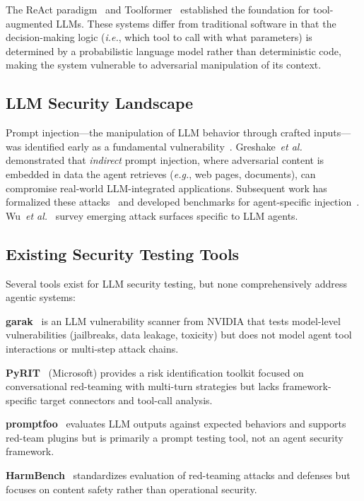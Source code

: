 \documentclass[letterpaper,twocolumn,10pt]{article}
\newcommand{\ie}{\textit{i.e.}}
\newcommand{\eg}{\textit{e.g.}}
\newcommand{\etal}{\textit{et al.}}
\begin{document}
The ReAct paradigm~\citep{yao2023react} and Toolformer~\citep{schick2023toolformer} established the foundation for tool-augmented LLMs.
These systems differ from traditional software in that the decision-making logic (\ie, which tool to call with what parameters) is determined by a probabilistic language model rather than deterministic code, making the system vulnerable to adversarial manipulation of its context.

\subsection{LLM Security Landscape}

Prompt injection---the manipulation of LLM behavior through crafted inputs---was identified early as a fundamental vulnerability~\citep{perez2022ignore}.
Greshake~\etal~\citep{greshake2023not} demonstrated that \textit{indirect} prompt injection, where adversarial content is embedded in data the agent retrieves (\eg, web pages, documents), can compromise real-world LLM-integrated applications.
Subsequent work has formalized these attacks~\citep{liu2024formalizing} and developed benchmarks for agent-specific injection~\citep{zhan2024injecagent, yi2023benchmarking, debenedetti2024agentdojo}.
Wu~\etal~\citep{wu2024new} survey emerging attack surfaces specific to LLM agents.

\subsection{Existing Security Testing Tools}

Several tools exist for LLM security testing, but none comprehensively address agentic systems:

\textbf{garak}~\citep{garak2024} is an LLM vulnerability scanner from NVIDIA that tests model-level vulnerabilities (jailbreaks, data leakage, toxicity) but does not model agent tool interactions or multi-step attack chains.

\textbf{PyRIT}~\citep{pyrit2024} (Microsoft) provides a risk identification toolkit focused on conversational red-teaming with multi-turn strategies but lacks framework-specific target connectors and tool-call analysis.

\textbf{promptfoo}~\citep{promptfoo2024} evaluates LLM outputs against expected behaviors and supports red-team plugins but is primarily a prompt testing tool, not an agent security framework.

\textbf{HarmBench}~\citep{mazeika2024harmbench} standardizes evaluation of red-teaming attacks and defenses but focuses on content safety rather than operational security.
\end{document}
